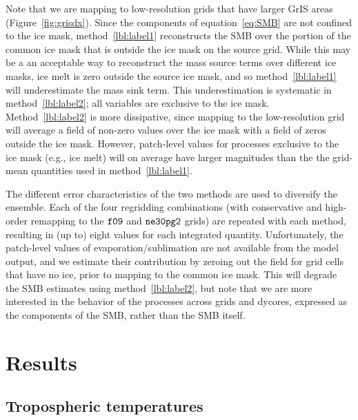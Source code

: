 \documentclass[draft]{agujournal2019}
\begin{document}
Note that we are mapping to low-resolution grids that have larger GrIS areas (Figure~\ref{fig:grisdx}). Since the components of equation~\ref{eq:SMB} are not confined to the ice mask, method~\ref{lbl:label1} reconstructs the SMB over the portion of the common ice mask that is outside the ice mask on the source grid. While this may be a an acceptable way to reconstruct the mass source terms over different ice masks, ice melt is zero outside the source ice mask, and so method~\ref{lbl:label1} will underestimate the mass sink term. This underestimation is systematic in method~\ref{lbl:label2}; all variables are exclusive to the ice mask. Method~\ref{lbl:label2} is more dissipative, since mapping to the low-resolution grid will average a field of non-zero values over the ice mask with a field of zeros outside the ice mask. However, patch-level values for processes exclusive to the ice mask (e.g., ice melt) will on average have larger magnitudes than the the grid-mean quantities used in method~\ref{lbl:label1}. %

The different error characteristics of the two methods are used to diversify the ensemble. Each of the four regridding combinations (with conservative and high-order remapping to the $\tt f09$ and $\tt ne30pg2$ grids) are repeated with each method, resulting in (up to) eight values for each integrated quantity. Unfortunately, the patch-level values of evaporation/sublimation are not available from the model output, and we estimate their contribution by zeroing out the field for grid cells that have no ice, prior to mapping to the common ice mask. This will degrade the SMB estimates using method~\ref{lbl:label2}, but note that we are more interested in the behavior of the processes across grids and dycores, expressed as the components of the SMB, rather than the SMB itself.

\section{Results}\label{sec:results}

\subsection{Tropospheric temperatures}
\end{document}
